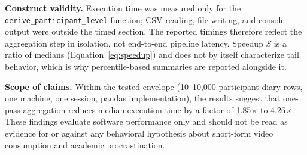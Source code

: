 \textbf{Construct validity.} Execution time was measured only for the \texttt{derive\_participant\_level} function; CSV reading, file writing, and console output were outside the timed section. The reported timings therefore reflect the aggregation step in isolation, not end-to-end pipeline latency. Speedup $S$ is a ratio of medians (Equation~\eqref{eq:speedup}) and does not by itself characterize tail behavior, which is why percentile-based summaries are reported alongside it.

\textbf{Scope of claims.} Within the tested envelope (10--10{,}000 participant diary rows, one machine, one session, pandas implementation), the results suggest that one-pass aggregation reduces median execution time by a factor of 1.85$\times$ to 4.26$\times$. These findings evaluate software performance only and should not be read as evidence for or against any behavioral hypothesis about short-form video consumption and academic procrastination.
